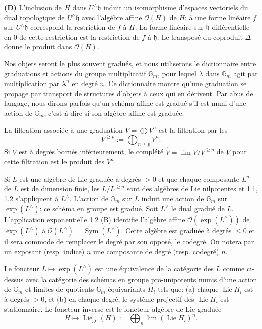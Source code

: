 \documentclass[10pt,a4paper]{article}
\newcommand{\Gm}{\mathbb G_m}
\newcommand{\Sym}{\operatorname{Sym}}
\newcommand{\Lie}{\operatorname{Lie}}
\newcommand{\OO}{\mathcal O}
\newcommand{\h}{\mathfrak h}
\newcommand{\Lhat}{L^{\wedge}}
\newcommand{\Uhat}{U^{\wedge}}
\newcommand{\Liegr}{\operatorname{Lie}_{\mathrm{gr}}}
\theoremstyle{deligne}
\newcommand{\heading}[1]{\vspace{0.65em}\noindent{\bfseries #1}\quad}
\begin{document}
\textbf{(D)} L'inclusion de \(H\) dans \(\Uhat\h\) induit un isomorphisme d'espaces vectoriels du dual topologique de \(\Uhat\h\) avec l'algèbre affine \(\OO(H)\) de \(H\): à une forme linéaire \(f\) sur \(\Uhat\h\) correspond la restriction de \(f\) à \(H\). La forme linéaire sur \(\h\) différentielle en \(0\) de cette restriction est la restriction de \(f\) à \(\h\). Le transposé du coproduit \(\Delta\) donne le produit dans \(\OO(H)\).

\heading{1.3.} Nos objets seront le plus souvent gradués, et nous utiliserons le dictionnaire entre graduations et actions du groupe multiplicatif \(\Gm\), pour lequel \(\lambda\) dans \(\Gm\) agit par multiplication par \(\lambda^n\) en degré \(n\). Ce dictionnaire montre qu'une graduation se propage par transport de structures d'objets à ceux qui en dérivent. Par abus de langage, nous dirons parfois qu'un schéma affine est gradué s'il est muni d'une action de \(\Gm\), c'est-à-dire si son algèbre affine est graduée.

La filtration associée à une graduation \(V=\bigoplus V^n\) est la filtration par les
\[
V^{\ge p}:=\bigoplus_{n\ge p}V^n.
\]
Si \(V\) est à degrés bornés inférieurement, le complété \(\widehat V=\lim V/V^{\ge p}\) de \(V\) pour cette filtration est le produit des \(V^n\).

Si \(L\) est une algèbre de Lie graduée à degrés \(>0\) et que chaque composante \(L^n\) de \(L\) est de dimension finie, les \(L/L^{\ge p}\) sont des algèbres de Lie nilpotentes et 1.1, 1.2 s'appliquent à \(\Lhat\). L'action de \(\Gm\) sur \(L\) induit une action de \(\Gm\) sur \(\exp(\Lhat)\): ce schéma en groupe est gradué. Soit \(L^\vee\) le dual gradué de \(L\). L'application exponentielle 1.2 (B) identifie l'algèbre affine \(\OO(\exp(\Lhat))\) de \(\exp(\Lhat)\) à \(\OO(\Lhat)=\Sym(L^\vee)\). Cette algèbre est graduée à degrés \(\le0\) et il sera commode de remplacer le degré par son opposé, le codegré. On notera par un exposant (resp. indice) \(n\) une composante de degré (resp. codegré) \(n\).

Le foncteur \(L\mapsto\exp(\Lhat)\) est une équivalence de la catégorie des \(L\) comme ci-dessus avec la catégorie des schémas en groupe pro-unipotents munis d'une action de \(\Gm\) et limites de quotients \(\Gm\)-équivariants \(H_i\) tels que: (a) chaque \(\Lie H_i\) est à degrés \(>0\), et (b) en chaque degré, le système projectif des \(\Lie H_i\) est stationnaire. Le foncteur inverse est le foncteur algèbre de Lie graduée
\[
H\longmapsto \Liegr(H):=\bigoplus_n\lim (\Lie H_i)^n.
\]
\end{document}
